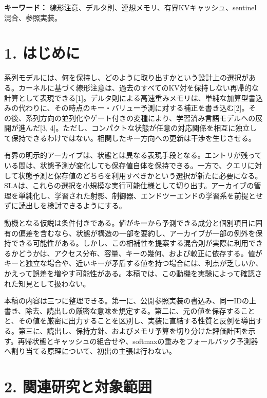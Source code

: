 \documentclass[11pt,a4paper]{article}
\begin{document}
\textbf{キーワード：} 線形注意、デルタ則、連想メモリ、有界KVキャッシュ、sentinel混合、参照実装。

\section{1. はじめに}\label{ux306fux3058ux3081ux306b}

系列モデルには、何を保持し、どのように取り出すかという設計上の選択がある。カーネルに基づく線形注意は、過去のすべてのKV対を保持しない再帰的な計算として表現できる{[}1{]}。デルタ則による高速重みメモリは、単純な加算型書込みの代わりに、その時点のキー・バリュー予測に対する補正を書き込む{[}2{]}。その後、系列方向の並列化やゲート付きの変種により、学習済み言語モデルへの展開が進んだ{[}3, 4{]}。ただし、コンパクトな状態が任意の対応関係を相互に独立して保持できるわけではない。相関したキー方向への更新は干渉を生じさせる。

有界の明示的アーカイブは、状態とは異なる表現手段となる。エントリが残っている間は、状態予測が変化しても保存値自体を保持できる。一方で、クエリに対して状態予測と保存値のどちらを利用すべきかという選択が新たに必要になる。SLAは、これらの選択を小規模な実行可能仕様として切り出す。アーカイブの管理を単純化し、学習された射影、制御器、エンドツーエンドの学習系を前提とせずに読出しを検討できるようにする。

動機となる仮説は条件付きである。値がキーから予測できる成分と個別項目に固有の偏差を含むなら、状態が構造の一部を要約し、アーカイブが一部の例外を保持できる可能性がある。しかし、この相補性を提案する混合則が実際に利用できるかどうかは、アクセス分布、容量、キーの幾何、および較正に依存する。値がキーと独立な場合や、近いキーが矛盾する値を持つ場合には、利点が乏しいか、かえって誤差を増やす可能性がある。本稿では、この動機を実験によって確認された知見として扱わない。

本稿の内容は三つに整理できる。第一に、公開参照実装の書込み、同一IDの上書き、除去、読出しの厳密な意味を規定する。第二に、元の値を保存することと、その値を厳密に出力することを区別し、実装に直結する性質と反例を導出する。第三に、読出し、保持方針、およびメモリ予算を切り分けた評価計画を示す。再帰状態とキャッシュの組合せや、softmaxの重みをフォールバック予測器へ割り当てる原理について、初出の主張は行わない。

\section{2. 関連研究と対象範囲}\label{ux95a2ux9023ux7814ux7a76ux3068ux5bfeux8c61ux7bc4ux56f2}
\end{document}
